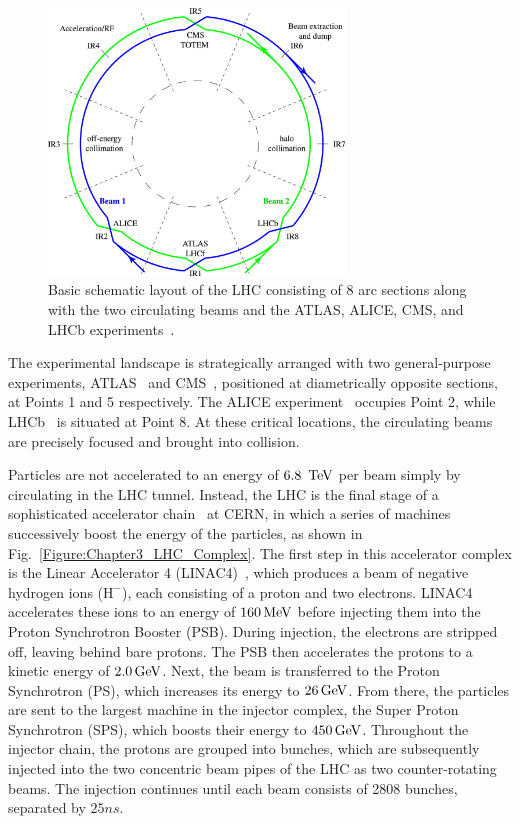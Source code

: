 \begin{figure}[h]
\centering
\includegraphics[width= 0.7\textwidth]{Figures/Chapter3/LHC_BasicLayout.jpg}
\caption{Basic schematic layout of the LHC consisting of 8 arc sections along with the two circulating beams and the ATLAS, ALICE, CMS, and LHCb experiments~\cite{LHC_BasicLayout}.}
\label{Figure:Chapter3_LHC_BasicLayout}
\end{figure}

The experimental landscape is strategically arranged with two general-purpose experiments, ATLAS~\cite{LHC_ATLAS} and CMS~\cite{LHC_CMS}, positioned at diametrically opposite sections, at Points 1 and 5 respectively. The ALICE experiment~\cite{LHC_ALICE} occupies Point 2, while LHCb~\cite{LHC_LCHb} is situated at Point 8. At these critical locations, the circulating beams are precisely focused and brought into collision.

Particles are not accelerated to an energy of $6.8~\,\text{Te\hspace{-.08em}V}$ per beam simply by circulating in the LHC tunnel. Instead, the LHC is the final stage of a sophisticated accelerator chain~\cite{LHC_InjectorComplex} at CERN, in which a series of machines successively boost the energy of the particles, as shown in Fig.~\ref{Figure:Chapter3_LHC_Complex}. The first step in this accelerator complex is the Linear Accelerator 4 (LINAC4)~\cite{LINAC4}, which produces a beam of negative hydrogen ions ($\text{H}^-$), each consisting of a proton and two electrons. LINAC4 accelerates these ions to an energy of $160\,\text{Me\hspace{-.08em}V}$ before injecting them into the Proton Synchrotron Booster (PSB). During injection, the electrons are stripped off, leaving behind bare protons. The PSB then accelerates the protons to a kinetic energy of $2.0\,\text{Ge\hspace{-.08em}V}$. Next, the beam is transferred to the Proton Synchrotron (PS), which increases its energy to $26\,\text{Ge\hspace{-.08em}V}$. From there, the particles are sent to the largest machine in the injector complex, the Super Proton Synchrotron (SPS), which boosts their energy to $450\,\text{Ge\hspace{-.08em}V}$. Throughout the injector chain, the protons are grouped into bunches, which are subsequently injected into the two concentric beam pipes of the LHC as two counter-rotating beams. The injection continues until each beam consists of 2808 bunches, separated by $25\unit{ns}$.

